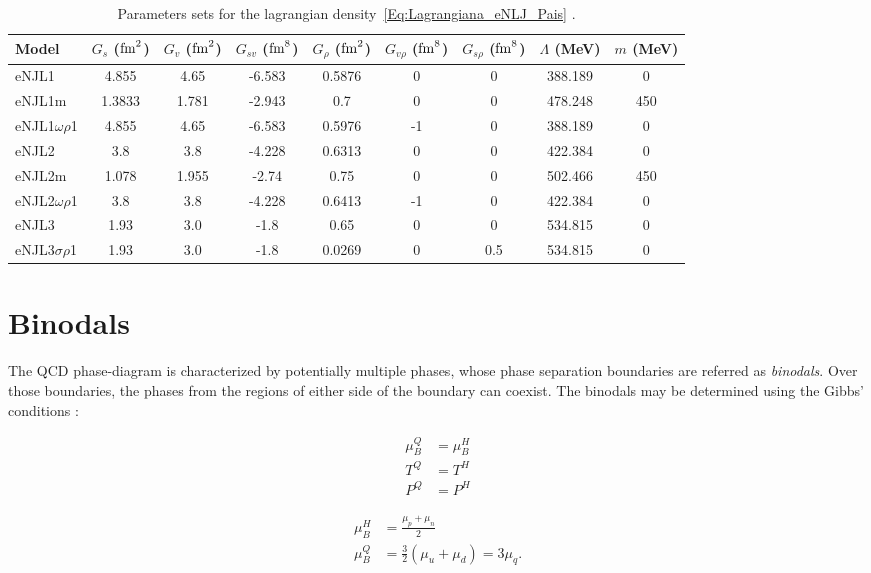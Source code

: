 \documentclass[plainsections,a0]{sciposterlocal}
\begin{document}
\begin{multicols}{2}
\begin{table}
\centering
\caption{Parameters sets for the lagrangian density~\eqref{Eq:Lagrangiana_eNLJ_Pais} \cite{Pais2016}. \label{Tab:Parametros_eNJL}}
\begin{tabular}{lcccccccc}
\toprule
Model & $G_s$ ($\rm{fm}^2$) & $G_v$ ($\rm{fm}^2$) & $G_{sv}$ ($\rm{fm}^8$) & $G_\rho$ ($\rm{fm}^2$) & $G_{v\rho}$ ($\rm{fm}^8$) & $G_{s\rho}$ ($\rm{fm}^8$) & $\Lambda$ (MeV) & $m$ (MeV) \\
\midrule
eNJL1 & 4.855 & 4.65 & -6.583 & 0.5876 & 0 & 0 & 388.189 & 0 \\
eNJL1m & 1.3833 & 1.781 & -2.943 & 0.7 & 0 & 0 & 478.248 & 450 \\
eNJL1$\omega\rho$1 & 4.855 & 4.65 & -6.583 & 0.5976 & -1 & 0 & 388.189 & 0 \\
eNJL2 & 3.8 & 3.8 & -4.228 & 0.6313 & 0 & 0 & 422.384 & 0 \\
eNJL2m & 1.078 & 1.955 & -2.74 & 0.75 & 0 & 0 & 502.466 & 450 \\
eNJL2$\omega\rho$1 & 3.8 & 3.8 & -4.228 & 0.6413 & -1 & 0 & 422.384 & 0 \\
eNJL3 & 1.93 & 3.0 & -1.8 & 0.65 & 0 & 0 & 534.815 & 0 \\
eNJL3$\sigma\rho$1 & 1.93 & 3.0 & -1.8 & 0.0269 & 0 & 0.5 & 534.815 & 0 \\
\bottomrule
\end{tabular}
\end{table}

\columnbreak

\section*{Binodals}

The QCD phase-diagram is characterized by potentially multiple phases, whose phase separation boundaries are referred as \emph{binodals}. Over those boundaries, the phases from the regions of either side of the boundary can coexist. The binodals may be determined using the Gibbs' conditions \cite{Cavagnoli2011}:

\begin{minipage}{0.5\columnwidth}
\begin{align*}
\mu_B^Q &= \mu_B^H\\
T^Q &= T^H \\
P^Q &= P^H
\end{align*}
\end{minipage}
\begin{minipage}{0.5\columnwidth}
\begin{align*}
	\mu_B^H &= \frac{\mu_p + \mu_n}{2} \\
	\mu_B^Q &= \frac{3}{2} (\mu_u + \mu_d) = 3 \mu_q.
\end{align*}
\end{minipage}


\end{multicols}
\end{document}
